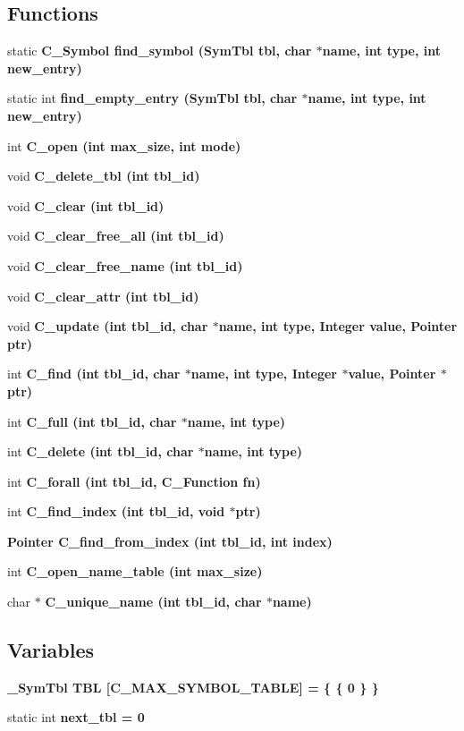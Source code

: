 \subsection*{Functions}
\begin{CompactItemize}
\item 
static \bf{C\_\-Symbol} \bf{find\_\-symbol} (\bf{Sym\-Tbl} tbl, char $\ast$\bf{name}, int type, int new\_\-entry)
\item 
static int \bf{find\_\-empty\_\-entry} (\bf{Sym\-Tbl} tbl, char $\ast$\bf{name}, int type, int new\_\-entry)
\item 
int \bf{C\_\-open} (int max\_\-size, int \bf{mode})
\item 
void \bf{C\_\-delete\_\-tbl} (int tbl\_\-id)
\item 
void \bf{C\_\-clear} (int tbl\_\-id)
\item 
void \bf{C\_\-clear\_\-free\_\-all} (int tbl\_\-id)
\item 
void \bf{C\_\-clear\_\-free\_\-name} (int tbl\_\-id)
\item 
void \bf{C\_\-clear\_\-attr} (int tbl\_\-id)
\item 
void \bf{C\_\-update} (int tbl\_\-id, char $\ast$\bf{name}, int type, \bf{Integer} value, \bf{Pointer} ptr)
\item 
int \bf{C\_\-find} (int tbl\_\-id, char $\ast$\bf{name}, int type, \bf{Integer} $\ast$value, \bf{Pointer} $\ast$ptr)
\item 
int \bf{C\_\-full} (int tbl\_\-id, char $\ast$\bf{name}, int type)
\item 
int \bf{C\_\-delete} (int tbl\_\-id, char $\ast$\bf{name}, int type)
\item 
int \bf{C\_\-forall} (int tbl\_\-id, \bf{C\_\-Function} fn)
\item 
int \bf{C\_\-find\_\-index} (int tbl\_\-id, void $\ast$ptr)
\item 
\bf{Pointer} \bf{C\_\-find\_\-from\_\-index} (int tbl\_\-id, int index)
\item 
int \bf{C\_\-open\_\-name\_\-table} (int max\_\-size)
\item 
char $\ast$ \bf{C\_\-unique\_\-name} (int tbl\_\-id, char $\ast$\bf{name})
\end{CompactItemize}
\subsection*{Variables}
\begin{CompactItemize}
\item 
\bf{\_\-Sym\-Tbl} \bf{TBL} [C\_\-MAX\_\-SYMBOL\_\-TABLE] = \{ \{ 0 \} \}
\item 
static int \bf{next\_\-tbl} = 0
\end{CompactItemize}


